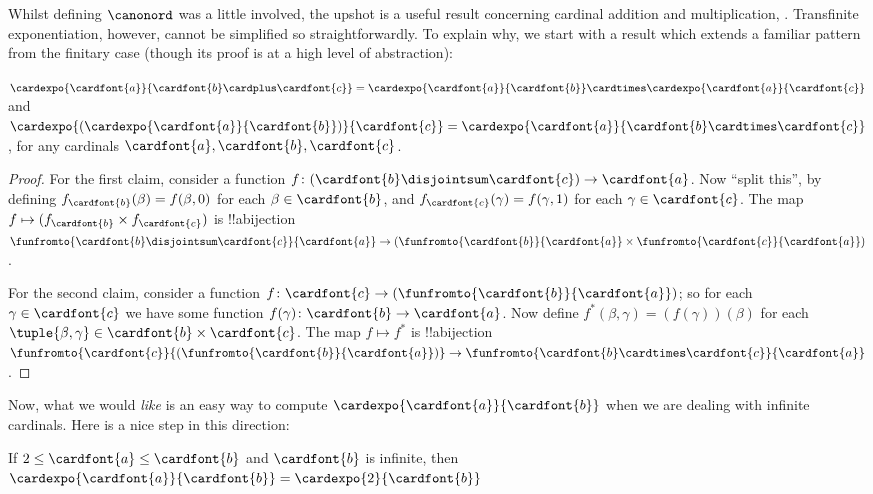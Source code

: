 \documentclass[../../../include/open-logic-section]{subfiles}
\begin{document}

Whilst defining $\canonord$ was a little involved, the upshot is a
useful result concerning cardinal addition and multiplication,
. Transfinite exponentiation, however,
cannot be simplified so straightforwardly. To explain why, we start
with a result which extends a familiar pattern from the finitary case
(though its proof is at a high level of abstraction):

\begin{prop}
$\cardexpo{\cardfont{a}}{\cardfont{b} \cardplus \cardfont{c}} =
\cardexpo{\cardfont{a}}{\cardfont{b}} \cardtimes
\cardexpo{\cardfont{a}}{\cardfont{c}}$ and
$\cardexpo{(\cardexpo{\cardfont{a}}{\cardfont{b}})}{\cardfont{c}} =
\cardexpo{\cardfont{a}}{\cardfont{b} \cardtimes \cardfont{c}}$, for
any cardinals $\cardfont{a}, \cardfont{b}, \cardfont{c}$.
\end{prop}

\begin{proof}
For the first claim, consider a function $f \colon
(\cardfont{b}\disjointsum\cardfont{c}) \to \cardfont{a}$. Now ``split
this'', by defining $f_\cardfont{b}(\beta) = f(\beta, 0)$ for each
$\beta \in \cardfont{b}$, and $f_\cardfont{c}(\gamma) = f(\gamma, 1)$
for each $\gamma \in \cardfont{c}$. The map $f \mapsto
(f_{\cardfont{b}} \times f_\cardfont{c})$ is !!a{bijection}
$\funfromto{\cardfont{b} \disjointsum \cardfont{c}}{\cardfont{a}} \to
(\funfromto{\cardfont{b}}{\cardfont{a}} \times
\funfromto{\cardfont{c}}{\cardfont{a}})$. 

For the second claim, consider a function $f \colon \cardfont{c} \to
(\funfromto{\cardfont{b}}{\cardfont{a}})$; so for each $\gamma \in
\cardfont{c}$ we have some function $f(\gamma) \colon \cardfont{b} \to
\cardfont{a}$. Now define $f^*(\beta, \gamma) = (f(\gamma))(\beta)$
for each $\tuple{\beta, \gamma} \in \cardfont{b} \times \cardfont{c}$.
The map $f \mapsto f^*$ is !!a{bijection}
$\funfromto{\cardfont{c}}{(\funfromto{\cardfont{b}}{\cardfont{a}})}
\to \funfromto{\cardfont{b} \cardtimes \cardfont{c}}{\cardfont{a}}$. 
\end{proof}

Now, what we would \emph{like} is an easy way to compute
$\cardexpo{\cardfont{a}}{\cardfont{b}}$ when we are dealing with
infinite cardinals. Here is a nice step in this direction:

\begin{prop}
If $2 \leq \cardfont{a} \leq \cardfont{b}$ and $\cardfont{b}$ is
infinite, then $\cardexpo{\cardfont{a}}{\cardfont{b}} =
\cardexpo{2}{\cardfont{b}}$
\end{prop}
\end{document}
